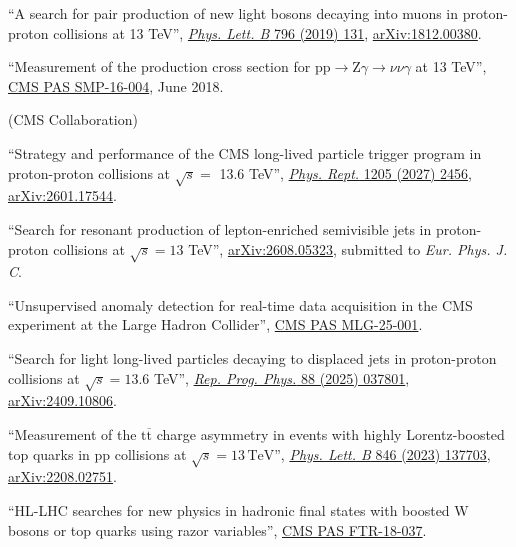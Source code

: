 \begin{description}[leftmargin=12pt,font=\normalfont\textit]
\begin{nbdescription}[leftmargin=12pt,font=\normalfont,labelsep=0em]
\item \begin{sloppypar}``A search for pair production of new light bosons decaying into muons in proton-proton collisions at 13 TeV'', \href{http://dx.doi.org/10.1016/j.physletb.2019.07.013}{\emph{Phys. Lett. B} 796 (2019) 131}, \href{https://arxiv.org/abs/1812.00380}{arXiv:1812.00380}.\end{sloppypar}
\item ``Measurement of the production cross section for $\text{p}\text{p} \to \text{Z}\gamma \to \nu\nu\gamma$ at 13 TeV'', \href{https://cds.cern.ch/record/2204922}{CMS PAS SMP-16-004}, June 2018.
\end{nbdescription}
\item[CMS Certified Language Editor (CCLE):] (CMS Collaboration)
\begin{nbdescription}[leftmargin=12pt,font=\normalfont,labelsep=0em]
\item ``Strategy and performance of the CMS long-lived particle trigger program in proton-proton collisions at $\sqrt{s}=$ 13.6 TeV'', \href{https://doi.org/10.1016/j.physrep.2026.07.007}{\emph{Phys. Rept.} 1205 (2027) 2456}, \href{https://arxiv.org/abs/2601.17544}{arXiv:2601.17544}.
\item \begin{sloppypar}``Search for resonant production of lepton-enriched semivisible jets in proton-proton collisions at $\sqrt{s} = 13$ TeV'', \href{https://arxiv.org/abs/2608.05323}{arXiv:2608.05323}, submitted to \emph{Eur. Phys. J. C}.\end{sloppypar}
\item ``Unsupervised anomaly detection for real-time data acquisition in the CMS experiment at the Large Hadron Collider'', \href{https://cds.cern.ch/record/2967864}{CMS PAS MLG-25-001}.
\item ``Search for light long-lived particles decaying to displaced jets in proton-proton collisions at $\sqrt{s} = 13.6$ TeV'', \href{https://dx.doi.org/10.1088/1361-6633/adaa13}{\emph{Rep. Prog. Phys.} 88 (2025) 037801}, \href{https://arxiv.org/abs/2409.10806}{arXiv:2409.10806}.
\item ``Measurement of the $\text{t}\overline{\text{t}}$ charge asymmetry in events with highly Lorentz-boosted top quarks in pp collisions at $\sqrt{s} = 13\,\text{TeV}$'', \href{https://doi.org/10.1016/j.physletb.2023.137703}{\emph{Phys. Lett. B} 846 (2023) 137703}, \href{https://arxiv.org/abs/2208.02751}{arXiv:2208.02751}.
\item ``HL-LHC searches for new physics in hadronic final states with boosted W bosons or top quarks using razor variables'', \href{https://cds.cern.ch/record/2658262}{CMS PAS FTR-18-037}.

\end{nbdescription}
\end{description}

